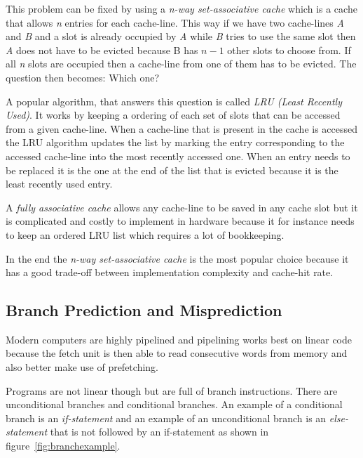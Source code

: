 This problem can be fixed by using a \textit{n-way set-associative cache} which is a cache that allows \textit{n} entries for each cache-line.
This way if we have two cache-lines \textit{A} and \textit{B} and a slot is already occupied by \textit{A} while \textit{B} tries to use the same slot then \textit{A} does not have to be evicted because B has $n-1$ other slots to choose from.
If all \textit{n} slots are occupied then a cache-line from one of them has to be evicted.
The question then becomes: Which one?

A popular algorithm, that answers this question is called \textit{LRU (Least Recently Used)}.
It works by keeping a ordering of each set of slots that can be accessed from a given cache-line. 
When a cache-line that is present in the cache is accessed the LRU algorithm updates the list by marking the entry corresponding to the accessed cache-line into the most recently accessed one.
When an entry needs to be replaced it is the one at the end of the list that is evicted because it is the least recently used entry.

A \textit{fully associative cache} allows any cache-line to be saved in any cache slot but it is complicated and costly to implement in hardware because it for instance needs to keep an ordered LRU list which requires a lot of bookkeeping.

In the end the \textit{n-way set-associative cache} is the most popular choice because it has a good trade-off between implementation complexity and cache-hit rate.


\subsection{Branch Prediction and Misprediction}
Modern computers are highly pipelined and pipelining works best on linear code because the fetch unit is then able to read consecutive words from memory and also better make use of prefetching.

Programs are not linear though but are full of branch instructions. There are unconditional branches and conditional branches. 
An example of a conditional branch is an \textit{if-statement} and an example of an unconditional branch is an \textit{else-statement} that is not followed by an if-statement as shown in figure~\ref{fig:branchexample}.

